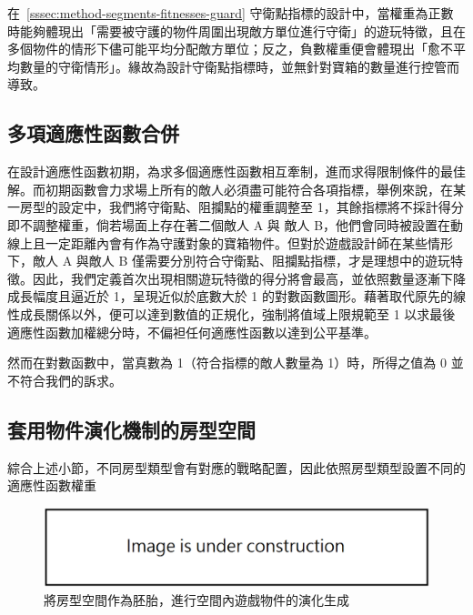 在~\ref{sssec:method-segments-fitnesses-guard} 守衛點指標的設計中，當權重為正數時能夠體現出「需要被守護的物件周圍出現敵方單位進行守衛」的遊玩特徵，且在多個物件的情形下儘可能平均分配敵方單位；反之，負數權重便會體現出「愈不平均數量的守衛情形」。緣故為設計守衛點指標時，並無針對寶箱的數量進行控管而導致。

\subsection{多項適應性函數合併}
\label{ssec:method-segments-multiobjectives}

在設計適應性函數初期，為求多個適應性函數相互牽制，進而求得限制條件的最佳解。而初期函數會力求場上所有的敵人必須盡可能符合各項指標，舉例來說，在某一房型的設定中，我們將守衛點、阻攔點的權重調整至 1，其餘指標將不採計得分即不調整權重，倘若場面上存在著二個敵人 A 與 敵人 B，他們會同時被設置在動線上且一定距離內會有作為守護對象的寶箱物件。但對於遊戲設計師在某些情形下，敵人 A 與敵人 B 僅需要分別符合守衛點、阻攔點指標，才是理想中的遊玩特徵。因此，我們定義首次出現相關遊玩特徵的得分將會最高，並依照數量逐漸下降成長幅度且逼近於 1，呈現近似於底數大於 1 的對數函數圖形。藉著取代原先的線性成長關係以外，便可以達到數值的正規化，強制將值域上限規範至 1 以求最後適應性函數加權總分時，不偏袒任何適應性函數以達到公平基準。

然而在對數函數中，當真數為 1（符合指標的敵人數量為 1）時，所得之值為 0 並不符合我們的訴求。

\subsection{套用物件演化機制的房型空間}
\label{ssec:method-segments-appliedonvolumes}

綜合上述小節，不同房型類型會有對應的戰略配置，因此依照房型類型設置不同的適應性函數權重

\begin{figure}[ht]
  \begin{center}
    \includegraphics[width=1.0\textwidth]{figures/under_construction.png}
    \caption{將房型空間作為胚胎，進行空間內遊戲物件的演化生成} 
    \label{fig:applied-ga-on-volume}
  \end{center}
\end{figure}











